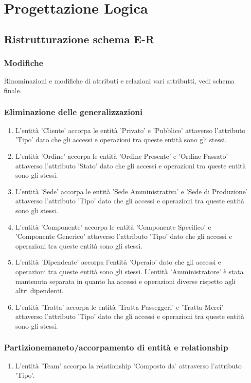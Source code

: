 \documentclass{article}
\begin{document}
\section{Progettazione Logica}

\subsection{Ristrutturazione schema E-R}

\subsubsection{Modifiche}
Rinominazioni e modifiche di attributi e relazioni vari attributti, vedi schema finale.

\subsubsection{Eliminazione delle generalizzazioni}
\begin{enumerate}
    \item L'entità 'Cliente' accorpa le entità 'Privato' e 'Pubblico' attaverso l'attributo 'Tipo' dato che gli accessi e operazioni tra queste entità sono gli stessi.
    \item L'entità 'Ordine' accorpa le entità 'Ordine Presente' e 'Ordine Passato' attaverso l'attributo 'Stato' dato che gli accessi e operazioni tra queste entità sono gli stessi.
    \item L'entità 'Sede' accorpa le entità 'Sede Amministrativa' e 'Sede di Produzione' attaverso l'attributo 'Tipo' dato che gli accessi e operazioni tra queste entità sono gli stessi.
    \item L'entità 'Componente' accorpa le entità 'Componente Specifico' e 'Componente Generico' attaverso l'attributo 'Tipo' dato che gli accessi e operazioni tra queste entità sono gli stessi.
    \item L'entità 'Dipendente' accorpa l'entità 'Operaio' dato che gli accessi e operazioni tra queste entità sono gli stessi. L'entità 'Amministratore' è stata mantenuta separata in quanto ha accessi e operazioni diverse rispetto agli altri dipendenti.
    \item L'entità 'Tratta' accorpa le entità 'Tratta Passeggeri' e 'Tratta Merci' attaverso l'attributo 'Tipo' dato che gli accessi e operazioni tra queste entità sono gli stessi.
\end{enumerate}

\subsubsection{Partizionemaneto/accorpamento di entità e relationship}
\begin{enumerate}
    \item L'entità 'Team' accorpa la relationship 'Composto da' attraverso l'attributo 'Tipo'.
\end{enumerate}
\end{document}
